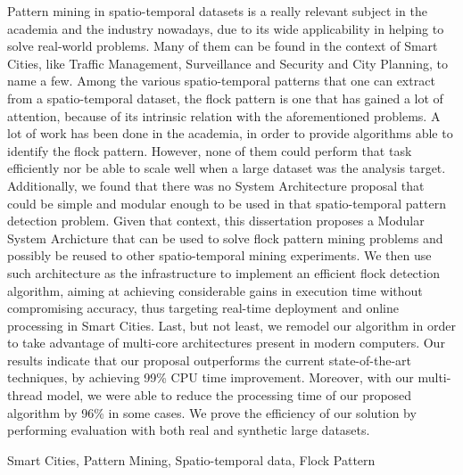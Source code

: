 Pattern mining in spatio-temporal datasets is a really relevant subject in the academia and the industry nowadays, due
to its wide applicability in helping to solve real-world problems. Many of them can be found in the context of Smart
Cities, like Traffic Management, Surveillance and Security and City Planning, to name a few. Among the various
spatio-temporal patterns that one can extract from a spatio-temporal dataset, the flock pattern is one that has gained a
lot of attention, because of its intrinsic relation with the aforementioned problems. A lot of work has been done in the
academia, in order to provide algorithms able to identify the flock pattern. However, none of them could perform that
task efficiently nor be able to scale well when a large dataset was the analysis target. Additionally, we found that
there was no System Architecture proposal that could be simple and modular enough to be used in that spatio-temporal
pattern detection problem. Given that context, this dissertation proposes a Modular System Archicture that can be used
to solve flock pattern mining problems and possibly be reused to other spatio-temporal mining experiments. We then use
such architecture as the infrastructure to implement an efficient flock detection algorithm, aiming at achieving
considerable gains in execution time without compromising accuracy, thus targeting real-time deployment and online
processing in Smart Cities. Last, but not least, we remodel our algorithm in order to take advantage of multi-core
architectures present in modern computers. Our results indicate that our proposal outperforms the current
state-of-the-art techniques, by achieving 99\% CPU time improvement. Moreover, with our multi-thread model, we were able
to reduce the processing time of our proposed algorithm by 96\% in some cases. We prove the efficiency of our solution
by performing evaluation with both real and synthetic large datasets.

\begin{keywords}
Smart Cities, Pattern Mining, Spatio-temporal data, Flock Pattern
\end{keywords}

